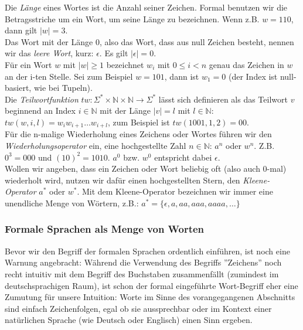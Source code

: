 \noindent
Die \emph{Länge} eines Wortes ist die Anzahl seiner Zeichen.
Formal benutzen wir die Betragsstriche um ein Wort, um seine
Länge zu bezeichnen. Wenn z.B. $w = 110$, dann gilt $|w| = 3$.\\

\noindent
Das Wort mit der Länge 0, also das Wort, dass aus null Zeichen besteht,
nennen wir das \emph{leere Wort}, kurz: $\epsilon$.
Es gilt $|\epsilon| = 0$.\\

\noindent
Für ein Wort $w$ mit $|w| \geq 1$ bezeichnet $w_i$ mit $0 \leq i < n$
genau das Zeichen in $w$ an der i-ten Stelle.
Sei zum Beispiel $w = 101$, dann ist $w_1 = 0$
(der Index ist null-basiert, wie bei Tupeln).\\

\noindent
Die \emph{Teilwortfunktion}
$tw: \Sigma^* \times \mathbb{N} \times \mathbb{N} \rightarrow \Sigma^*$
lässt sich definieren als das Teilwort $v$ beginnend an Index $i \in \mathbb{N}$
mit der Länge $|v| = l$ mit $l \in \mathbb{N}$:
$tw(w, i, l) = w_iw_{i+1}\ldots{}w_{i+l}$,
zum Beispiel ist $tw(1001, 1, 2) = 00$.\\

\noindent
Für die n-malige Wiederholung eines Zeichens oder Wortes führen wir den \emph{Wiederholungsoperator}
ein, eine hochgestellte Zahl $n \in \mathbb{N}$: $a^n$ oder $w^n$.
Z.B. $0^3 = 000$ und $(10)^2 = 1010$.
$a^0$ bzw. $w^0$ entspricht dabei $\epsilon$.\\

\noindent
Wollen wir angeben, dass ein Zeichen oder Wort beliebig oft (also auch 0-mal) wiederholt
wird, nutzen wir dafür einen hochgestellten Stern, den \emph{Kleene-Operator} $a^*$ oder $w^*$.
Mit dem Kleene-Operator bezeichnen wir immer eine unendliche Menge von Wörtern, z.B.:
$a^* = \{\epsilon, a, aa, aaa, aaaa, \dots\}$

\subsubsection{Formale Sprachen als Menge von Worten}

Bevor wir den Begriff der formalen Sprachen ordentlich einführen,
ist noch eine Warnung angebracht:
Während die Verwendung des Begriffs ''Zeichens''
noch recht intuitiv mit dem Begriff des Buchstaben zusammenfällt
(zumindest im deutschsprachigen Raum),
ist schon der formal eingeführte Wort-Begriff eher eine Zumutung für unsere Intuition:
Worte im Sinne des vorangegangenen Abschnitts sind einfach Zeichenfolgen,
egal ob sie aussprechbar oder im Kontext einer natürlichen Sprache
(wie Deutsch oder Englisch) einen Sinn ergeben.

